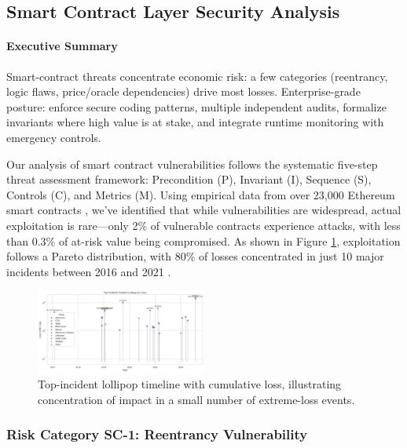 \subsection{Smart Contract Layer Security Analysis}
\label{sec:results_smart_contract}

\paragraph{Executive Summary}
Smart-contract threats concentrate economic risk: a few categories (reentrancy, logic flaws, price/oracle dependencies) drive most losses. Enterprise-grade posture: enforce secure coding patterns, multiple independent audits, formalize invariants where high value is at stake, and integrate runtime monitoring with emergency controls.

Our analysis of smart contract vulnerabilities follows the systematic five-step threat assessment framework: Precondition (P), Invariant (I), Sequence (S), Controls (C), and Metrics (M). Using empirical data from over 23,000 Ethereum smart contracts \cite{perez2021analysis}, we've identified that while vulnerabilities are widespread, actual exploitation is rare—only 2\% of vulnerable contracts experience attacks, with less than 0.3\% of at-risk value being compromised. As shown in Figure \ref{fig:smart_contract_pareto}, exploitation follows a Pareto distribution, with 80\% of losses concentrated in just 10 major incidents between 2016 and 2021 \cite{zhou2023sok}.

\begin{figure}[H]
\centering
\includegraphics[width=0.5\textwidth]{../figure/Figure/figures_2/J17_lollipop_timeline_top_loss.png}
\caption{Top-incident lollipop timeline with cumulative loss, illustrating concentration of impact in a small number of extreme-loss events.}
\label{fig:smart_contract_pareto}
\end{figure}

\subsubsection{Risk Category SC-1: Reentrancy Vulnerability}

